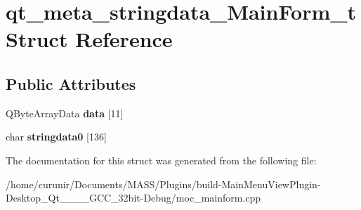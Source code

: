 \hypertarget{structqt__meta__stringdata___main_form__t}{}\section{qt\+\_\+meta\+\_\+stringdata\+\_\+\+Main\+Form\+\_\+t Struct Reference}
\label{structqt__meta__stringdata___main_form__t}
\subsection*{Public Attributes}
\begin{DoxyCompactItemize}
\item 
Q\+Byte\+Array\+Data {\bfseries data} \mbox{[}11\mbox{]}\hypertarget{structqt__meta__stringdata___main_form__t_a9605f0952179062a9c5b5d21245fe49c}{}\label{structqt__meta__stringdata___main_form__t_a9605f0952179062a9c5b5d21245fe49c}

\item 
char {\bfseries stringdata0} \mbox{[}136\mbox{]}\hypertarget{structqt__meta__stringdata___main_form__t_a8d7418fdcaa60bb4916948133fd4eedb}{}\label{structqt__meta__stringdata___main_form__t_a8d7418fdcaa60bb4916948133fd4eedb}

\end{DoxyCompactItemize}


The documentation for this struct was generated from the following file\+:\begin{DoxyCompactItemize}
\item 
/home/curunir/\+Documents/\+M\+A\+S\+S/\+Plugins/build-\/\+Main\+Menu\+View\+Plugin-\/\+Desktop\+\_\+\+Qt\+\_\+\_\+\_\+\_\+\+G\+C\+C\+\_\+32bit-\/\+Debug/moc\+\_\+mainform.\+cpp\end{DoxyCompactItemize}
